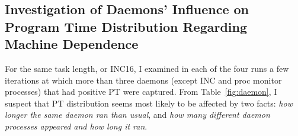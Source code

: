 \newpage
\clearpage

\subsection{Investigation of Daemons' Influence on Program Time Distribution Regarding Machine Dependence~\label{sec:daemon_impact}} 

For the same task length, or INC16, 
I examined in each of the four runs a few iterations at which more than three daemons (except INC and proc monitor processes) that had positive PT were captured.  
From Table~\ref{fig:daemon}, I suspect that PT distribution seems most likely to be affected by two facts: {\it how longer the same daemon ran than usual}, and {\it how many different daemon processes appeared and how long it ran}.

